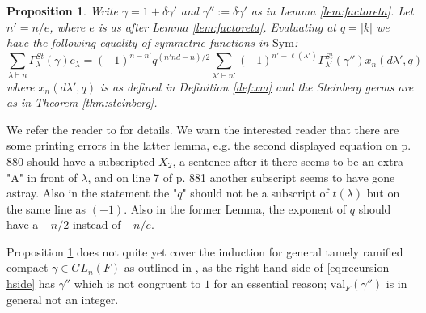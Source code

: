 \documentclass{amsart}
\numberwithin{equation}{section}
\newtheorem{proposition}[lemma]{Proposition}%
\theoremstyle{definition}
\def\val{\mathrm{val}}
\def\Sym{{\mathrm{Sym}}}
\begin{document}
\begin{proposition}
\label{prop:wrecursion}
Write $\gamma=1+\delta\gamma'$ and $\gamma'':=\delta\gamma'$ as in Lemma \ref{lem:factoreta}. Let $n'=n/e$, where $e$ is as after Lemma \ref{lem:factoreta}. Evaluating at $q=|k|$ we have the following equality of symmetric functions in $\Sym$:
\begin{equation}
\label{eq:recursion-hside}
\sum_{\lambda\vdash n} \Gamma^{St}_\lambda(\gamma)e_\lambda=(-1)^{n-n'}q^{(n'n d-n)/2}\sum_{\lambda'\vdash n'} (-1)^{n'-\ell(\lambda')}\Gamma^{St}_{\lambda'}(\gamma'')x_n(d\lambda',q)
\end{equation}
where $x_n(d\lambda',q)$ is as defined in Definition \ref{def:xm} and the Steinberg germs are as in Theorem \ref{thm:steinberg}.
\end{proposition}
We refer the reader to \cite[Lemme VII 5., Lemme V 12.]{W2} for details. We warn the interested reader that there are some printing errors in the latter lemma, e.g. the second displayed equation on p. 880 should have a subscripted $X_2$, a sentence after it there seems to be an extra "A" in front of $\lambda$, and on line 7 of p. 881 another subscript seems to have gone astray. Also in the statement the "$q$" should not be a subscript of $t(\lambda)$ but on the same line as $(-1)$. Also in the former Lemma, the exponent of $q$ should have a $-n/2$ instead of $-n/e$.
 
Proposition \ref{prop:wrecursion} does not quite yet cover the induction for general tamely ramified compact $\gamma\in GL_n(F)$ as outlined in \cite[Section VII 7.]{W2}, as the right hand side of \eqref{eq:recursion-hside} has $\gamma''$ which is not congruent to $1$ for an essential reason; $\val_F(\gamma'')$  is in general not an integer.
\end{document}
